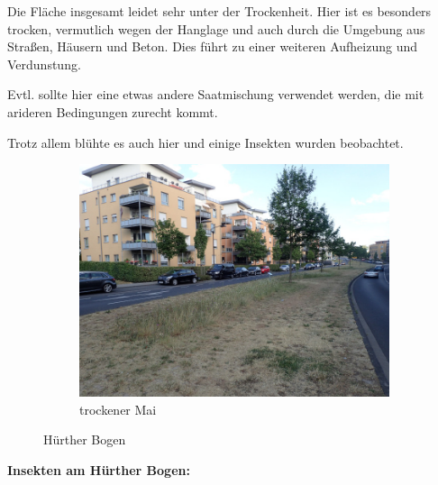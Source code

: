 \documentclass[11pt]{article}
\begin{document}
Die Fläche insgesamt leidet sehr unter der Trockenheit.
Hier ist es besonders trocken, vermutlich wegen der Hanglage und auch durch die Umgebung aus Straßen, Häusern und Beton. Dies führt zu einer weiteren Aufheizung und Verdunstung.

Evtl. sollte hier eine etwas andere Saatmischung verwendet werden, die mit arideren Bedingungen zurecht kommt.

Trotz allem blühte es auch hier und einige Insekten wurden beobachtet. 

\begin{figure}[h!]
  \centering
  \begin{subfigure}[b]{0.31\linewidth}
    \includegraphics[width=\linewidth]{img/bogen/mai.jpg}
    \caption{trockener Mai}
  \end{subfigure}
  \caption{Hürther Bogen}
\end{figure}


\clearpage
\textbf{Insekten am Hürther Bogen:}
\end{document}
